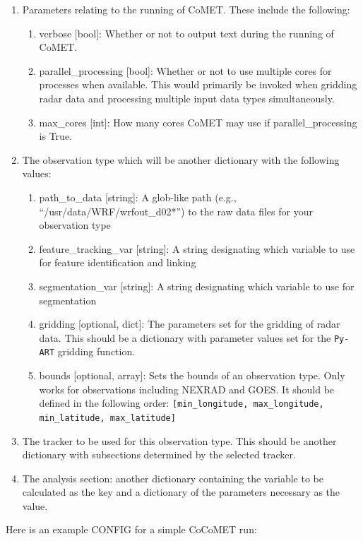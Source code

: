 \documentclass[10pt,a4paper]{article}
\begin{document}
	\begin{enumerate}
		\item Parameters relating to the running of CoMET. These include the following:
		\begin{enumerate}
			\item verbose [bool]: Whether or not to output text during the running of CoMET.
			\item parallel\_processing [bool]: Whether or not to use multiple cores for processes when available. This would primarily be invoked when gridding radar data and processing multiple input data types simultaneously.
			\item max\_cores [int]: How many cores CoMET may use if parallel\_processing is True.
		\end{enumerate}
		\item The observation type which will be another dictionary with the following values:
		\begin{enumerate}
			\item path\_to\_data [string]: A glob-like path (e.g., “/usr/data/WRF/wrfout\_d02*”) to the raw data files for your observation type
			\item feature\_tracking\_var [string]: A string designating which variable to use for feature identification and linking
			\item segmentation\_var [string]: A string designating which variable to use for segmentation
			\item gridding [optional, dict]: The parameters set for the gridding of radar data. This should be a dictionary with parameter values set for the \verb|Py-ART| gridding function.
			\item bounds [optional, array]: Sets the bounds of an observation type. Only works for observations including NEXRAD and GOES. It should be defined in the following order: \verb|[min_longitude, max_longitude, min_latitude, max_latitude]|
		\end{enumerate}
		\item The tracker to be used for this observation type. This should be another dictionary with subsections determined by the selected tracker.
		\item The analysis section: another dictionary containing the variable to be calculated as the key and a dictionary of the parameters necessary as the value. 
	\end{enumerate}
	
	Here is an example CONFIG for a simple \ac{CoCoMET} run:
	
\end{document}
